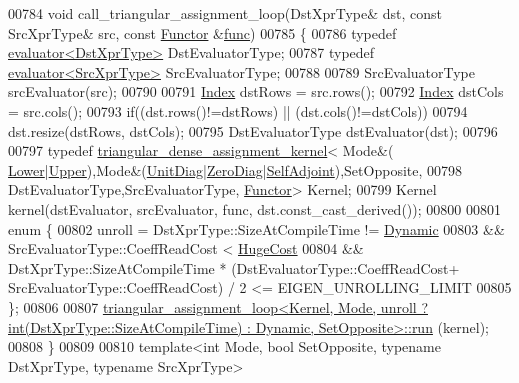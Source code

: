 \begin{DoxyCode}
00784 \textcolor{keywordtype}{void} call\_triangular\_assignment\_loop(DstXprType& dst, \textcolor{keyword}{const} SrcXprType& src, \textcolor{keyword}{const} 
      \hyperlink{struct_functor}{Functor} &\hyperlink{structfunc}{func})
00785 \{
00786   \textcolor{keyword}{typedef} \hyperlink{struct_eigen_1_1internal_1_1evaluator}{evaluator<DstXprType>} DstEvaluatorType;
00787   \textcolor{keyword}{typedef} \hyperlink{struct_eigen_1_1internal_1_1evaluator}{evaluator<SrcXprType>} SrcEvaluatorType;
00788 
00789   SrcEvaluatorType srcEvaluator(src);
00790 
00791   \hyperlink{namespace_eigen_a62e77e0933482dafde8fe197d9a2cfde}{Index} dstRows = src.rows();
00792   \hyperlink{namespace_eigen_a62e77e0933482dafde8fe197d9a2cfde}{Index} dstCols = src.cols();
00793   \textcolor{keywordflow}{if}((dst.rows()!=dstRows) || (dst.cols()!=dstCols))
00794     dst.resize(dstRows, dstCols);
00795   DstEvaluatorType dstEvaluator(dst);
00796     
00797   \textcolor{keyword}{typedef} \hyperlink{class_eigen_1_1internal_1_1triangular__dense__assignment__kernel}{triangular\_dense\_assignment\_kernel}< Mode&(
      \hyperlink{group__enums_gga39e3366ff5554d731e7dc8bb642f83cda891792b8ed394f7607ab16dd716f60e6}{Lower}|\hyperlink{group__enums_gga39e3366ff5554d731e7dc8bb642f83cda6bcb58be3b8b8ec84859ce0c5ac0aaec}{Upper}),Mode&(\hyperlink{group__enums_gga39e3366ff5554d731e7dc8bb642f83cdaddb72f888ac85d5a1c52333e54f9374b}{UnitDiag}|\hyperlink{group__enums_gga39e3366ff5554d731e7dc8bb642f83cda884ff7240392e85aa6e4b3c957e36483}{ZeroDiag}|\hyperlink{group__enums_gga39e3366ff5554d731e7dc8bb642f83cda2491fc6765056421f504eb7e16083e8f}{SelfAdjoint}),SetOpposite,
00798                                               DstEvaluatorType,SrcEvaluatorType,
      \hyperlink{struct_functor}{Functor}> Kernel;
00799   Kernel kernel(dstEvaluator, srcEvaluator, func, dst.const\_cast\_derived());
00800   
00801   \textcolor{keyword}{enum} \{
00802       unroll = DstXprType::SizeAtCompileTime != \hyperlink{namespace_eigen_ad81fa7195215a0ce30017dfac309f0b2}{Dynamic}
00803             && SrcEvaluatorType::CoeffReadCost < \hyperlink{namespace_eigen_a3163430a1c13173faffde69016b48aaf}{HugeCost}
00804             && DstXprType::SizeAtCompileTime * (DstEvaluatorType::CoeffReadCost+
      SrcEvaluatorType::CoeffReadCost) / 2 <= EIGEN\_UNROLLING\_LIMIT
00805     \};
00806   
00807   
      \hyperlink{struct_eigen_1_1internal_1_1triangular__assignment__loop}{triangular\_assignment\_loop<Kernel, Mode, unroll ? int(DstXprType::SizeAtCompileTime) : Dynamic,
       SetOpposite>::run}
      (kernel);
00808 \}
00809 
00810 \textcolor{keyword}{template}<\textcolor{keywordtype}{int} Mode, \textcolor{keywordtype}{bool} SetOpposite, \textcolor{keyword}{typename} DstXprType, \textcolor{keyword}{typename} SrcXprType>

\end{DoxyCode}
